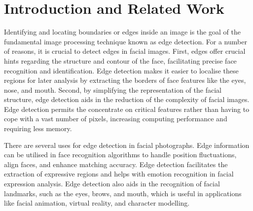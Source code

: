 \documentclass{70_styles/svproc}
\begin{document}
\section{Introduction and Related Work}
Identifying and locating boundaries or edges inside an image is the goal of the fundamental image processing technique known as edge detection. For a number of reasons, it is crucial to detect edges in facial images.  First, edges offer crucial hints regarding the structure and contour of the face, facilitating precise face recognition and identification. Edge detection makes it easier to localise these regions for later analysis by extracting the borders of face features like the eyes, nose, and mouth. Second, by simplifying the representation of the facial structure, edge detection aids in the reduction of the complexity of facial images. Edge detection permits the concentrate on critical features rather than having to cope with a vast number of pixels, increasing computing performance and requiring less memory.

There are several uses for edge detection in facial photographs. Edge information can be utilised in face recognition algorithms to handle position fluctuations, align faces, and enhance matching accuracy. Edge detection facilitates the extraction of expressive regions and helps with emotion recognition in facial expression analysis. Edge detection also aids in the recognition of facial landmarks, such as the eyes, brows, and mouth, which is useful in applications like facial animation, virtual reality, and character modelling.
\end{document}
